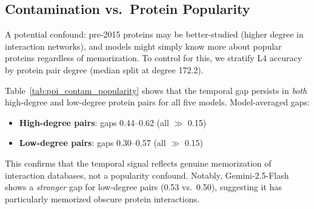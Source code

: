 \subsection{Contamination vs.\ Protein Popularity}

A potential confound: pre-2015 proteins may be better-studied (higher degree in interaction networks), and models might simply know more about popular proteins regardless of memorization. To control for this, we stratify L4 accuracy by protein pair degree (median split at degree 172.2).

Table~\ref{tab:ppi_contam_popularity} shows that the temporal gap persists in \emph{both} high-degree and low-degree protein pairs for all five models. Model-averaged gaps:
\begin{itemize}[nosep,leftmargin=*]
    \item \textbf{High-degree pairs}: gaps 0.44--0.62 (all $\gg$ 0.15)
    \item \textbf{Low-degree pairs}: gaps 0.30--0.57 (all $\gg$ 0.15)
\end{itemize}

This confirms that the temporal signal reflects genuine memorization of interaction databases, not a popularity confound. Notably, Gemini-2.5-Flash shows a \emph{stronger} gap for low-degree pairs (0.53 vs.\ 0.50), suggesting it has particularly memorized obscure protein interactions.

